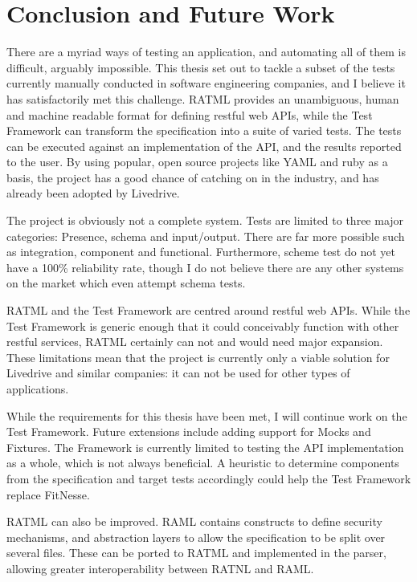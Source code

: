 \chapter{Conclusion and Future Work}

There are a myriad ways of testing an application, and automating all of them is difficult, arguably impossible. This thesis set out to tackle a subset of the tests currently manually conducted in software engineering companies, and I believe it has satisfactorily met this challenge. RATML provides an unambiguous, human and machine readable format for defining restful web APIs, while the Test Framework can transform the specification into a suite of varied tests. The tests can be executed against an implementation of the API, and the results reported to the user. By using popular, open source projects like YAML and ruby as a basis, the project has a good chance of catching on in the industry, and has already been adopted by Livedrive. 

The project is obviously not a complete system. Tests are limited to three major categories: Presence, schema and input/output. There are far more possible such as integration, component and functional. Furthermore, scheme test do not yet have a 100\% reliability rate, though I do not believe there are any other systems on the market which even attempt schema tests.

RATML and the Test Framework are centred around restful web APIs. While the Test Framework is generic enough that it could conceivably function with other restful services, RATML certainly can not and would need major expansion. These limitations mean that the project is currently only a viable solution for Livedrive and similar companies: it can not be used for other types of applications.

While the requirements for this thesis have been met, I will continue work on the Test Framework. Future extensions include adding support for Mocks and Fixtures. The Framework is currently limited to testing the API implementation as a whole, which is not always beneficial. A heuristic to determine components from the specification and target tests accordingly could help the Test Framework replace FitNesse.

RATML can also be improved. RAML contains constructs to define security mechanisms, and abstraction layers to allow the specification to be split over several files. These can be ported to RATML and implemented in the parser, allowing greater interoperability between RATNL and RAML.

